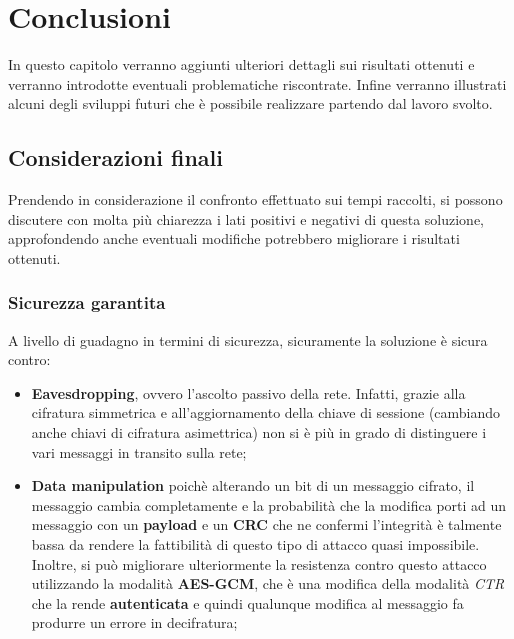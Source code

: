 \chapter{Conclusioni} %
%

\begin{citazione}
	In questo capitolo verranno aggiunti ulteriori dettagli sui risultati ottenuti e verranno introdotte eventuali problematiche riscontrate. Infine verranno illustrati alcuni degli sviluppi futuri che è possibile realizzare partendo dal lavoro svolto.
\end{citazione}

\section{Considerazioni finali}
Prendendo in considerazione il confronto effettuato sui tempi raccolti, si possono discutere con molta più chiarezza i lati positivi e negativi di questa soluzione, approfondendo anche eventuali modifiche potrebbero migliorare i risultati ottenuti.

\subsection{Sicurezza garantita}
A livello di guadagno in termini di sicurezza, sicuramente la soluzione è sicura contro: 
\begin{itemize}
	\item \textbf{Eavesdropping}, ovvero l'ascolto passivo della rete. Infatti, grazie alla cifratura simmetrica e all'aggiornamento della chiave di sessione (cambiando anche chiavi di cifratura asimettrica) non si è più in grado di distinguere i vari messaggi in transito sulla rete;
	\item \textbf{Data manipulation} poichè alterando un bit di un messaggio cifrato, il messaggio cambia completamente e la probabilità che la modifica porti ad un messaggio con un \textbf{payload} e un \textbf{CRC} che ne confermi l'integrità è talmente bassa da rendere la fattibilità di questo tipo di attacco quasi impossibile. Inoltre, si può migliorare ulteriormente la resistenza contro questo attacco utilizzando la modalità \textbf{AES-GCM}, che è una modifica della modalità \emph{CTR} che la rende \textbf{autenticata} e quindi qualunque modifica al messaggio fa produrre un errore in decifratura; \cite{wikipedia_gcm}
\end{itemize}

